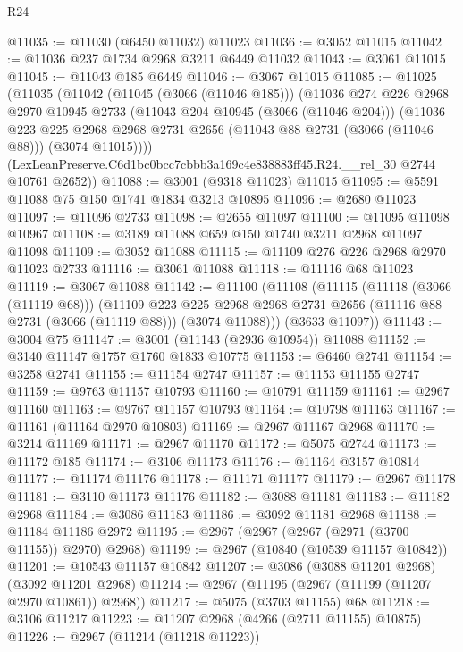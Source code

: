 \begin{lexlean}{R24}
\begin{coremodule}
@11035 := @11030 (@6450 @11032) @11023
@11036 := @3052 @11015
@11042 := @11036 @237 @1734 @2968 @3211 @6449 @11032
@11043 := @3061 @11015
@11045 := @11043 @185 @6449
@11046 := @3067 @11015
@11085 := @11025
    (@11035
      (@11042
        (@11045 (@3066 (@11046 @185)))
        (@11036
          @274
          @226
          @2968
          @2970
          @10945
          @2733
          (@11043 @204 @10945 (@3066 (@11046 @204)))
          (@11036
            @223
            @225
            @2968
            @2968
            @2731
            @2656
            (@11043 @88 @2731 (@3066 (@11046 @88)))
            (@3074 @11015))))
      (LexLeanPreserve.C6d1bc0bcc7cbbb3a169c4e838883ff45.R24.__rel_30 @2744 @10761 @2652))
@11088 := @3001 (@9318 @11023) @11015
@11095 := @5591 @11088 @75 @150 @1741 @1834 @3213 @10895
@11096 := @2680 @11023
@11097 := @11096 @2733
@11098 := @2655 @11097
@11100 := @11095 @11098 @10967
@11108 := @3189 @11088 @659 @150 @1740 @3211 @2968 @11097 @11098
@11109 := @3052 @11088
@11115 := @11109 @276 @226 @2968 @2970 @11023 @2733
@11116 := @3061 @11088
@11118 := @11116 @68 @11023
@11119 := @3067 @11088
@11142 := @11100
    (@11108
      (@11115
        (@11118 (@3066 (@11119 @68)))
        (@11109
          @223
          @225
          @2968
          @2968
          @2731
          @2656
          (@11116 @88 @2731 (@3066 (@11119 @88)))
          (@3074 @11088)))
      (@3633 @11097))
@11143 := @3004 @75
@11147 := @3001 (@11143 (@2936 @10954)) @11088
@11152 := @3140 @11147 @1757 @1760 @1833 @10775
@11153 := @6460 @2741
@11154 := @3258 @2741
@11155 := @11154 @2747
@11157 := @11153 @11155 @2747
@11159 := @9763 @11157 @10793
@11160 := @10791 @11159
@11161 := @2967 @11160
@11163 := @9767 @11157 @10793
@11164 := @10798 @11163
@11167 := @11161 (@11164 @2970 @10803)
@11169 := @2967 @11167 @2968
@11170 := @3214 @11169
@11171 := @2967 @11170
@11172 := @5075 @2744
@11173 := @11172 @185
@11174 := @3106 @11173
@11176 := @11164 @3157 @10814
@11177 := @11174 @11176
@11178 := @11171 @11177
@11179 := @2967 @11178
@11181 := @3110 @11173 @11176
@11182 := @3088 @11181
@11183 := @11182 @2968
@11184 := @3086 @11183
@11186 := @3092 @11181 @2968
@11188 := @11184 @11186 @2972
@11195 := @2967 (@2967 (@2967 (@2971 (@3700 @11155)) @2970) @2968)
@11199 := @2967 (@10840 (@10539 @11157 @10842))
@11201 := @10543 @11157 @10842
@11207 := @3086 (@3088 @11201 @2968) (@3092 @11201 @2968)
@11214 := @2967 (@11195 (@2967 (@11199 (@11207 @2970 @10861)) @2968))
@11217 := @5075 (@3703 @11155) @68
@11218 := @3106 @11217
@11223 := @11207 @2968 (@4266 (@2711 @11155) @10875)
@11226 := @2967 (@11214 (@11218 @11223))

\end{coremodule}
\end{lexlean}
